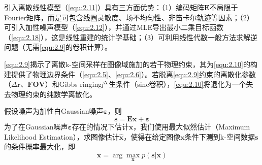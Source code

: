 \documentclass[12pt]{article}
\begin{document}
引入离散线性模型（\autoref{equ:2.11}）具有三方面优势：（1）编码矩阵$\mathbf{E}$不局限于Fourier矩阵，而是可包含线圈灵敏度、场不均匀性、非笛卡尔轨迹等因素；（2）可引入加性噪声模型（\autoref{equ:2.12}），并通过MLE导出最小二乘目标函数（\autoref{equ:2.18}），这是线性重建的统计学基础；（3）可利用线性代数一般方法求解逆问题（无需\autoref{equ:2.9}的卷积计算）。

\autoref{equ:2.9}揭示了离散k-空间采样在图像域施加的若干物理约束，其为\autoref{equ:2.10}的构建提供了物理边界条件（\autoref{equ:2.5}、\autoref{equ:2.6}）。若脱离\autoref{equ:2.9}约束的离散化参数（$\Delta\bm{r}$、$\mathbf{FOV}$）和Gibbs ringing产生条件（sinc卷积），\autoref{equ:2.10}将退化为一个失去物理约束的纯数学离散化。

假设噪声为加性白Gaussian噪声$\bm{\varepsilon}$，则
\begin{equation}
    \bm{s}=\mathbf{E}\bm{x}+\bm{\varepsilon}
    \label{equ:2.12}
\end{equation}
为了在Gaussian噪声$\bm{\varepsilon}$存在的情况下估计$\bm{x}$，我们使用最大似然估计（Maximum Likelihood Estimation），求图像估计$\hat{\bm{x}}$，使得在给定图像$\bm{x}$条件下测到k-空间数据$\bm{s}$的条件概率最大化，即
\begin{equation}
    \hat{\bm{x}}=\arg\max_{\bm{x}} p(\bm{s}|\bm{x})
    \label{equ:2.13}
\end{equation}
\end{document}
